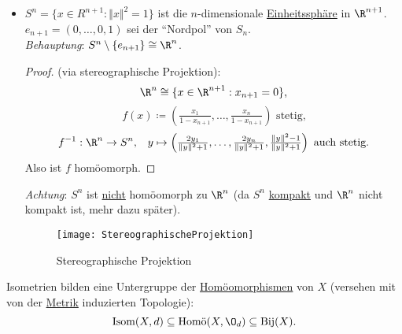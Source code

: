 \begin{example}
\begin{itemize}
      \begin{proof}
        (über \( \epsilon \)-\( \delta \)-Definition): \( \delta \coloneqq \epsilon \). \\
        \( d_X(x, y) < \delta \Rightarrow d_Y(f(x), f(y)) = d_X(x,y) < \delta = \epsilon \), also ist \( f \) stetig. \\
        Analog für \( f^{-1} \).
      \end{proof}
    \item \( S^n = \{ x \in R^{n+1} : \Vert x \Vert^2 = 1 \} \) ist die \( n \)-dimensionale \hyperref[bsp:einheitssphaere]{Einheitssphäre} in \( \R^{n+1} \). \\
      \( e_{n+1} = (0,\dots,0,1) \) sei der ``Nordpol'' von \( S_n \). \\
      \emph{Behauptung}: \( S^n\setminus \{ e_{n+1} \} \cong \R^n \).
      \begin{proof}
        (via stereographische Projektion):
        \begin{equation*}
          \R^n \cong \{ x \in \R^{n+1} : x_{n+1} = 0 \}\text{,}
        \end{equation*}
        \begin{equation*}
          f(x) \coloneqq (\tfrac{x_1}{1-x_{n+1}}, \dots, \tfrac{x_n}{1-x_{n+1}}) \text{ stetig,}
        \end{equation*}
        \begin{equation*}
          f^{-1}: \R^n \to S^n\text{,} \quad y \mapsto \left( \tfrac{2y_1}{\Vert y \Vert^2+1}, \dots, \tfrac{2y_n}{\Vert y \Vert^2+1}, \tfrac{\Vert y \Vert^2-1}{\Vert y \Vert^2+1} \right)\text{ auch stetig.}
        \end{equation*}
        Also ist \( f \) homöomorph.
      \end{proof}
      \emph{Achtung}: \( S^n \) ist \underline{nicht} homöomorph zu \( \R^n \) (da \( S^n \) \hyperref[def:kompakt]{kompakt} und \( \R^n \) nicht kompakt ist, mehr dazu später).
      \begin{figure}[H]
        \texttt{[image: StereographischeProjektion]}
        \caption{Stereographische Projektion}
      \end{figure}
  \end{itemize}
\end{example}

\begin{remark}
  Isometrien bilden eine Untergruppe der \hyperref[def:homoeomorphismus]{Homöomorphismen} von \( X \) (versehen mit von der \hyperref[def:metrik]{Metrik} induzierten Topologie):
  \begin{equation*}
    \text{Isom}(X, d) \subseteq \text{Homö}(X, \O_d) \subseteq \text{Bij}(X)\text{.}
  \end{equation*}
\end{remark}

